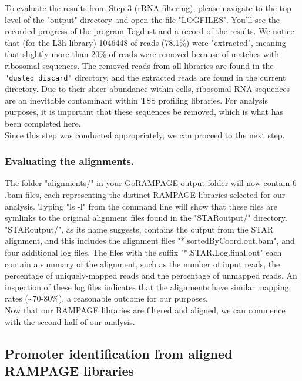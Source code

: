 \documentclass[runningheads,a4paper]{llncs}
\begin{document}
\begin{linenumbers}
To evaluate the results from Step 3 (rRNA filtering), please navigate to the top level of the "output" directory and open the file "LOGFILES".
You'll see the recorded progress of the program Tagdust and a record of the results.
We notice that (for the L3h library) 1046448 of reads (78.1\%) were "extracted", meaning that slightly more than 20\% of reads were removed because of matches with ribosomal sequences.
The removed reads from all libraries are found in the \texttt{"dusted\_discard"} directory, and the extracted reads are found in the current directory. 
Due to their sheer abundance within cells, ribosomal RNA sequences are an inevitable contaminant within TSS profiling libraries. 
For analysis purposes, it is important that these sequences be removed, which is what has been completed here.\\
Since this step was conducted appropriately, we can proceed to the next step.

\subsubsection{Evaluating the alignments.}

The folder "alignments/" in your GoRAMPAGE output folder will now contain 6 .bam files, each representing the distinct RAMPAGE libraries selected for our analysis.
Typing "ls -l" from the command line will show that these files are symlinks to the original alignment files found in the "STARoutput/" directory.
"STARoutput/", as its name suggests, contains the output from the STAR alignment, and this includes the alignment files "*.sortedByCoord.out.bam", and four additional log files.
The files with the suffix "*.STAR.Log.final.out" each contain a summary of the alignment, such as the number of input reads, the percentage of uniquely-mapped reads and the percentage of unmapped reads.
An inspection of these log files indicates that the alignments have similar mapping rates (\textasciitilde70-80\%), a reasonable outcome for our purposes.\\

\noindent
Now that our RAMPAGE libraries are filtered and aligned, we can commence with the second half of our analysis.

\subsection{Promoter identification from aligned RAMPAGE libraries}


\end{linenumbers}
\end{document}
